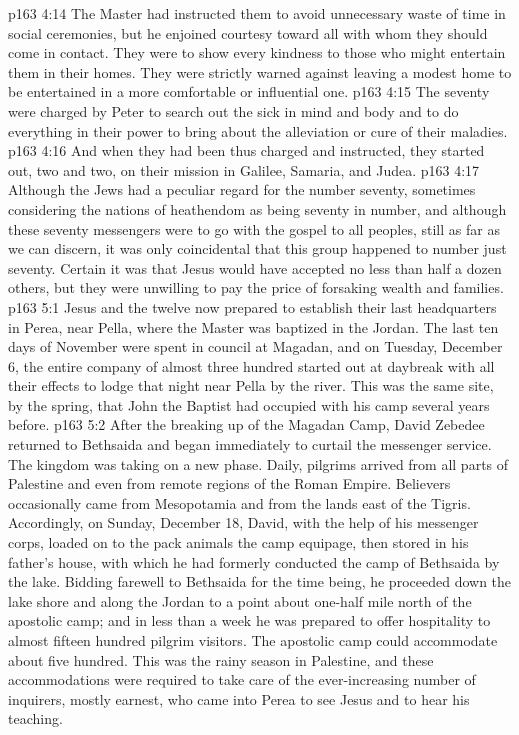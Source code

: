 \pc \vs p163 4:14 \bibnobreakspace {} The Master had instructed them to avoid unnecessary waste of time in social ceremonies, but he enjoined courtesy toward all with whom they should come in contact. They were to show every kindness to those who might entertain them in their homes. They were strictly warned against leaving a modest home to be entertained in a more comfortable or influential one.
\pc \vs p163 4:15 \bibnobreakspace {} The seventy were charged by Peter to search out the sick in mind and body and to do everything in their power to bring about the alleviation or cure of their maladies.
\pc \vs p163 4:16 And when they had been thus charged and instructed, they started out, two and two, on their mission in Galilee, Samaria, and Judea.
\vs p163 4:17 Although the Jews had a peculiar regard for the number seventy, sometimes considering the nations of heathendom as being seventy in number, and although these seventy messengers were to go with the gospel to all peoples, still as far as we can discern, it was only coincidental that this group happened to number just seventy. Certain it was that Jesus would have accepted no less than half a dozen others, but they were unwilling to pay the price of forsaking wealth and families.\plusone
{}
\vs p163 5:1 Jesus and the twelve now prepared to establish their last headquarters in Perea, near Pella, where the Master was baptized in the Jordan. The last ten days of November were spent in council at Magadan, and on Tuesday, December 6, the entire company of almost three hundred started out at daybreak with all their effects to lodge that night near Pella by the river. This was the same site, by the spring, that John the Baptist had occupied with his camp several years before.
\vs p163 5:2 After the breaking up of the Magadan Camp, David Zebedee returned to Bethsaida and began immediately to curtail the messenger service. The kingdom was taking on a new phase. Daily, pilgrims arrived from all parts of Palestine and even from remote regions of the Roman Empire. Believers occasionally came from Mesopotamia and from the lands east of the Tigris. Accordingly, on Sunday, December 18, David, with the help of his messenger corps, loaded on to the pack animals the camp equipage, then stored in his father’s house, with which he had formerly conducted the camp of Bethsaida by the lake. Bidding farewell to Bethsaida for the time being, he proceeded down the lake shore and along the Jordan to a point about one\hyp{}half mile north of the apostolic camp; and in less than a week he was prepared to offer hospitality to almost fifteen hundred pilgrim visitors. The apostolic camp could accommodate about five hundred. This was the rainy season in Palestine, and these accommodations were required to take care of the ever\hyp{}increasing number of inquirers, mostly earnest, who came into Perea to see Jesus and to hear his teaching.\plusone
